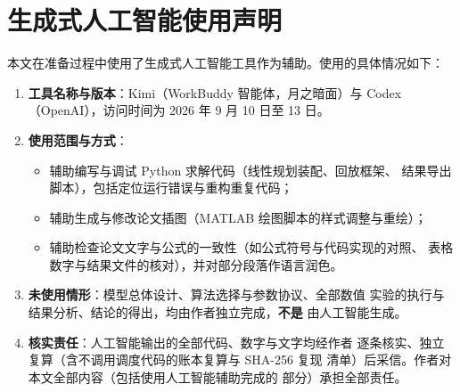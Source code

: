 
\section*{生成式人工智能使用声明}

本文在准备过程中使用了生成式人工智能工具作为辅助。使用的具体情况如下：

\begin{enumerate}
  \item \textbf{工具名称与版本}：Kimi（WorkBuddy 智能体，月之暗面）与
        Codex（OpenAI），访问时间为 2026 年 9 月 10 日至 13 日。
  \item \textbf{使用范围与方式}：
    \begin{itemize}
      \item 辅助编写与调试 Python 求解代码（线性规划装配、回放框架、
            结果导出脚本），包括定位运行错误与重构重复代码；
      \item 辅助生成与修改论文插图（MATLAB 绘图脚本的样式调整与重绘）；
      \item 辅助检查论文文字与公式的一致性（如公式符号与代码实现的对照、
            表格数字与结果文件的核对），并对部分段落作语言润色。
    \end{itemize}
  \item \textbf{未使用情形}：模型总体设计、算法选择与参数协议、全部数值
        实验的执行与结果分析、结论的得出，均由作者独立完成，\textbf{不是}
        由人工智能生成。
  \item \textbf{核实责任}：人工智能输出的全部代码、数字与文字均经作者
        逐条核实、独立复算（含不调用调度代码的账本复算与 SHA-256 复现
        清单）后采信。作者对本文全部内容（包括使用人工智能辅助完成的
        部分）承担全部责任。
\end{enumerate}
